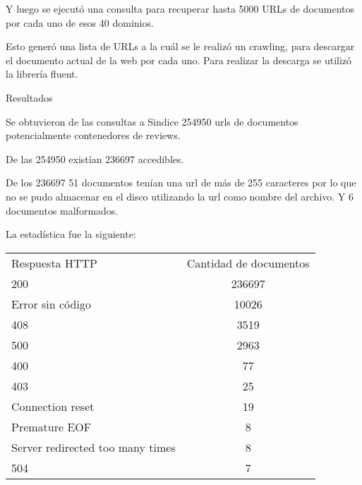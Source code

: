 Y luego se ejecutó una consulta para recuperar hasta 5000 URLs de documentos por cada uno de esos 40 dominios.

Esto generó una lista de URLs a la cuál se le realizó un crawling, para descargar el documento actual de la web por cada uno. Para realizar la descarga se utilizó la librería fluent.



Resultados

Se obtuvieron de las consultas a Sindice 254950 urls de documentos potencialmente contenedores de reviews.

De las 254950 existían 236697 accedibles.

De los 236697 51 documentos tenían una url de más de 255 caracteres por lo que no se pudo almacenar en el disco utilizando la url como nombre del archivo. Y 6 documentos malformados.

La estadística fue la siguiente:

\begin{tabular}{| l | c | }
   Respuesta HTTP & Cantidad de documentos \\
   200 & 236697 \\
   Error sin código & 10026 \\
   408 & 3519 \\
   500 & 2963 \\
   400 & 77 \\
   403 & 25 \\
   Connection reset & 19 \\
   Premature EOF & 8 \\
   Server redirected too many times & 8 \\
   504 & 7 \\
 \end{tabular}

